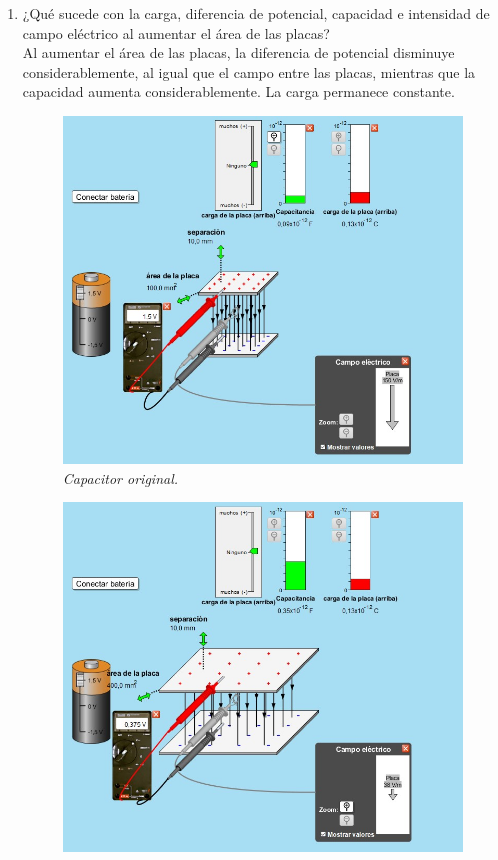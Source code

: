 \documentclass[12pt]{report}
\begin{document}
\begin{enumerate}
\begin{enumerate}
        
  \item ¿Qué sucede con la carga, diferencia de potencial, capacidad e intensidad de campo eléctrico al aumentar el área de las placas?\\[6pt]
            Al aumentar el área de las placas, la diferencia de potencial disminuye considerablemente, al igual que el campo entre las placas, mientras que la capacidad aumenta considerablemente. La carga permanece constante.\\

      \begin{figure}[h]
          \centering
          \begin{minipage}[h]{0.4\textwidth}
          \centering
          \includegraphics[width=1\textwidth]{./images/3foto1.jpg} 
          \textit{Capacitor original.} 
          \end{minipage}\hskip 1cm
          \begin{minipage}[h]{0.4\textwidth}
          \centering
          \includegraphics[width=1\textwidth]{./images/3foto3.jpg} 

\end{minipage}
\end{figure}
\end{enumerate}
\end{enumerate}
\end{document}
